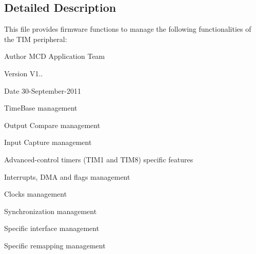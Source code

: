 \subsection{Detailed Description}
This file provides firmware functions to manage the following functionalities of the T\+IM peripheral\+: 

\begin{DoxyAuthor}{Author}
M\+CD Application Team 
\end{DoxyAuthor}
\begin{DoxyVersion}{Version}
V1.. 
\end{DoxyVersion}
\begin{DoxyDate}{Date}
30-\/\+September-\/2011
\begin{DoxyItemize}
\item Time\+Base management
\item Output Compare management
\item Input Capture management
\item Advanced-\/control timers (T\+I\+M1 and T\+I\+M8) specific features
\item Interrupts, D\+MA and flags management
\item Clocks management
\item Synchronization management
\item Specific interface management
\item Specific remapping management
\end{DoxyItemize}
\end{DoxyDate}
